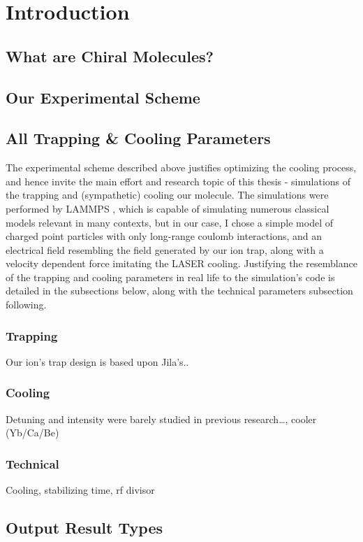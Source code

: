 \chapter{Introduction}\label{chap:intro}

\section{What are Chiral Molecules?}\label{what-are-chiral-molecules}

\section{Our Experimental Scheme}\label{our-experimental-scheme}

\section{All Trapping \& Cooling Parameters}\label{all-trapping-cooling-parameters}

The experimental scheme described above justifies optimizing the cooling
process, and hence invite the main effort and research topic of this
thesis - simulations of the trapping and (sympathetic) cooling our
molecule. The simulations were performed by LAMMPS , which is capable of
simulating numerous classical models relevant in many contexts, but in
our case, I chose a simple model of charged point particles with only
long-range coulomb interactions, and an electrical field resembling the
field generated by our ion trap, along with a velocity dependent force
imitating the LASER cooling. Justifying the resemblance of the trapping
and cooling parameters in real life to the simulation's code is detailed
in the subsections below, along with the technical parameters subsection
following.

\subsection{Trapping}\label{trapping}

Our ion's trap design is based upon Jila's..

\subsection{Cooling}\label{cooling}

Detuning and intensity were barely studied in previous research\ldots,
cooler (Yb/Ca/Be)

\subsection{Technical}\label{technical}

Cooling, stabilizing time, rf divisor

\section{Output Result Types}\label{output-result-types}
